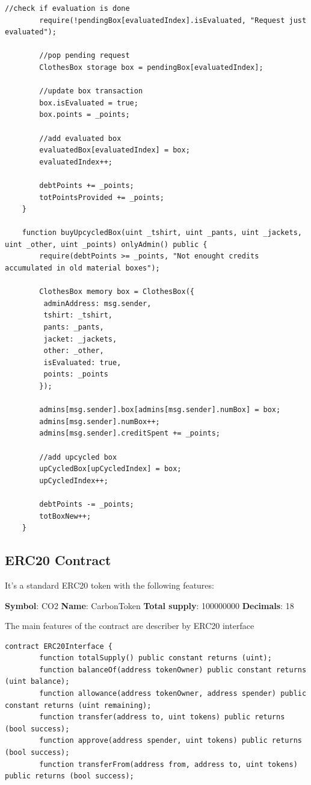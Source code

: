 {\begin{lstlisting}[language=Solidity]
        //check if evaluation is done
        require(!pendingBox[evaluatedIndex].isEvaluated, "Request just evaluated");

        //pop pending request
        ClothesBox storage box = pendingBox[evaluatedIndex];

        //update box transaction
        box.isEvaluated = true;
        box.points = _points;

        //add evaluated box
        evaluatedBox[evaluatedIndex] = box;
        evaluatedIndex++;

        debtPoints += _points;
        totPointsProvided += _points;
    }

    function buyUpcycledBox(uint _tshirt, uint _pants, uint _jackets, uint _other, uint _points) onlyAdmin() public {
        require(debtPoints >= _points, "Not enought credits accumulated in old material boxes");

        ClothesBox memory box = ClothesBox({
         adminAddress: msg.sender,
         tshirt: _tshirt,
         pants: _pants,
         jacket: _jackets,
         other: _other,
         isEvaluated: true,
         points: _points
        });

        admins[msg.sender].box[admins[msg.sender].numBox] = box;
        admins[msg.sender].numBox++;
        admins[msg.sender].creditSpent += _points;

        //add upcycled box
        upCycledBox[upCycledIndex] = box;
        upCycledIndex++;

        debtPoints -= _points;
        totBoxNew++;
    }

\end{lstlisting}

\subsection{ERC20 Contract}

It's a standard ERC20 token with the following features:

\begin{outline}
    \1 \textbf{Symbol}: CO2
    \1 \textbf{Name}: CarbonToken
    \1 \textbf{Total supply}: 100000000
    \1 \textbf{Decimals}: 18
\end{outline}

The main features of the contract are describer by ERC20 interface

\begin{lstlisting}[language=Solidity]
    contract ERC20Interface {
        function totalSupply() public constant returns (uint);
        function balanceOf(address tokenOwner) public constant returns (uint balance);
        function allowance(address tokenOwner, address spender) public constant returns (uint remaining);
        function transfer(address to, uint tokens) public returns (bool success);
        function approve(address spender, uint tokens) public returns (bool success);
        function transferFrom(address from, address to, uint tokens) public returns (bool success);
    

\end{lstlisting}}
